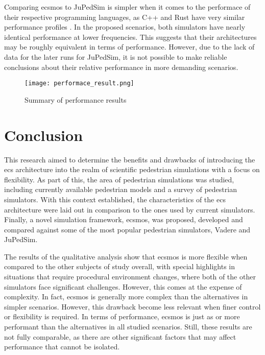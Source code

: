 \documentclass[twoside, 11pt]{article}
\begin{document}
Comparing \gls{ecsmos} to JuPedSim is simpler when it comes to the performace of their respective programming languages, as C++ and Rust have very similar performance profiles \cite{electronics12010143}. In the proposed scenarios, both simulators have nearly identical performance at lower frequencies. This suggests that their architectures may be roughly equivalent in terms of performance. However, due to the lack of data for the later runs for JuPedSim, it is not possible to make reliable conclusions about their relative performance in more demanding scenarios.


\begin{figure}
  \centering
  \texttt{[image: performace\_result.png]}
  \caption[Summary of performance results]{Summary of performance results}
  \label{fig:performace-results}
\end{figure}

\section{Conclusion} \label{sec:conclusion}

This research aimed to determine the benefits and drawbacks of introducing the \gls{ecs} architecture into the realm of scientific pedestrian simulations with a focus on flexibility. As part of this, the area of pedestrian simulations was studied, including currently available pedestrian models and a survey of pedestrian simulators. With this context established, the characteristics of the \gls{ecs} architecture were laid out in comparison to the ones used by current simulators. Finally, a novel simulation framework, \gls{ecsmos}, was proposed, developed and compared against some of the most popular pedestrian simulators, Vadere and JuPedSim.

The results of the qualitative analysis show that \gls{ecsmos} is more flexible when compared to the other subjects of study overall, with special highlights in situations that require procedural environment changes, where both of the other simulators face significant challenges. However, this comes at the expense of complexity. In fact, \gls{ecsmos} is generally more complex than the alternatives in simpler scenarios. However, this drawback become less relevant when finer control or flexibility is required. In terms of performance, \gls{ecsmos} is just as or more performant than the alternatives in all studied scenarios. Still, these results are not fully comparable, as there are other significant factors that may affect performance that cannot be isolated.
\end{document}

